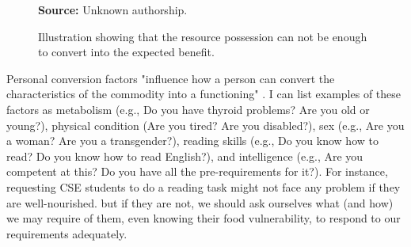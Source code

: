 \begin{figure}[ht!]
\centering

\caption{\textmd{Illustration showing that the resource possession can not be enough to convert into the expected benefit.}}
\label{fig:resources-conversion-factors}

\par\medskip\ABNTEXfontereduzida\selectfont\textbf{Source:} Unknown authorship.%
\end{figure}

Personal conversion factors "influence how a person can convert the characteristics of the commodity into a functioning" \cite[p.~99]{robeyns:2005}. I can list examples of these factors as metabolism (e.g., Do you have thyroid problems? Are you old or young?), physical condition (Are you tired? Are you disabled?), sex (e.g., Are you a woman? Are you a transgender?), reading skills (e.g., Do you know how to read? Do you know how to read English?), and intelligence (e.g., Are you competent at this? Do you have all the pre-requirements for it?). For instance, requesting \gls{CSE} students to do a reading task might not face any problem if they are well-nourished. but if they are not, we should ask ourselves what (and how) we may require of them, even knowing their food vulnerability, to respond to our requirements adequately.

